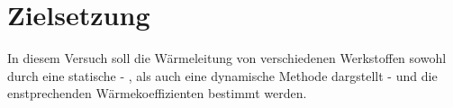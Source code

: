 \section{Zielsetzung}
In diesem Versuch soll die Wärmeleitung von verschiedenen Werkstoffen sowohl durch 
eine statische - , als auch eine dynamische Methode dargstellt - und die enstprechenden Wärmekoeffizienten bestimmt werden.